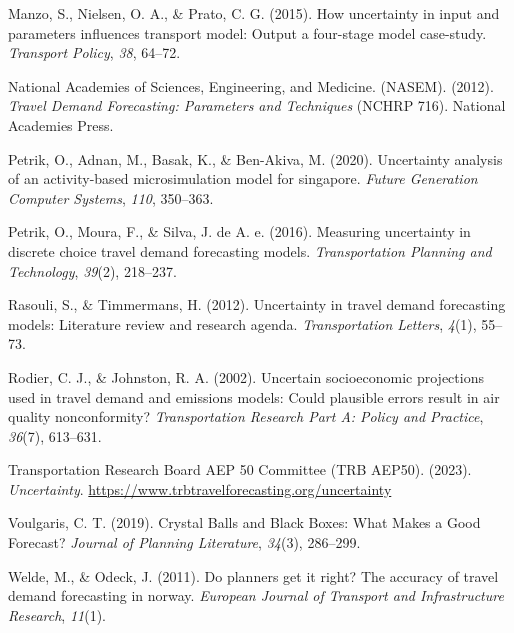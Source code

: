 \documentclass[fancy, masters]{byuthesis}
\newlength{\cslhangindent}
\newlength{\cslentryspacingunit} %
\newenvironment{CSLReferences}[2] %
 {%
  \setlength{\parindent}{0pt}
  \ifodd #1
  \let\oldpar\par
  \def\par{\hangindent=\cslhangindent\oldpar}
  \fi
  \setlength{\parskip}{#2\cslentryspacingunit}
 }%
 {}
\begin{document}
\begin{CSLReferences}{1}{0}
\leavevmode{}%
Manzo, S., Nielsen, O. A., \& Prato, C. G. (2015). How uncertainty in input and parameters influences transport model: Output a four-stage model case-study. \emph{Transport Policy}, \emph{38}, 64--72.

\leavevmode{}%
National Academies of Sciences, Engineering, and Medicine. (NASEM). (2012). \emph{Travel {Demand Forecasting}: {Parameters} and {Techniques}} (NCHRP 716). {National Academies Press}.

\leavevmode{}%
Petrik, O., Adnan, M., Basak, K., \& Ben-Akiva, M. (2020). Uncertainty analysis of an activity-based microsimulation model for singapore. \emph{Future Generation Computer Systems}, \emph{110}, 350--363.

\leavevmode{}%
Petrik, O., Moura, F., \& Silva, J. de A. e. (2016). Measuring uncertainty in discrete choice travel demand forecasting models. \emph{Transportation Planning and Technology}, \emph{39}(2), 218--237.

\leavevmode{}%
Rasouli, S., \& Timmermans, H. (2012). Uncertainty in travel demand forecasting models: Literature review and research agenda. \emph{Transportation Letters}, \emph{4}(1), 55--73.

\leavevmode{}%
Rodier, C. J., \& Johnston, R. A. (2002). Uncertain socioeconomic projections used in travel demand and emissions models: Could plausible errors result in air quality nonconformity? \emph{Transportation Research Part A: Policy and Practice}, \emph{36}(7), 613--631.

\leavevmode{}%
Transportation Research Board AEP 50 Committee (TRB AEP50). (2023). \emph{Uncertainty}. \url{https://www.trbtravelforecasting.org/uncertainty}

\leavevmode{}%
Voulgaris, C. T. (2019). Crystal {Balls} and {Black Boxes}: {What Makes} a {Good Forecast}? \emph{Journal of Planning Literature}, \emph{34}(3), 286--299.

\leavevmode{}%
Welde, M., \& Odeck, J. (2011). Do planners get it right? The accuracy of travel demand forecasting in norway. \emph{European Journal of Transport and Infrastructure Research}, \emph{11}(1).


\end{CSLReferences}
\end{document}
